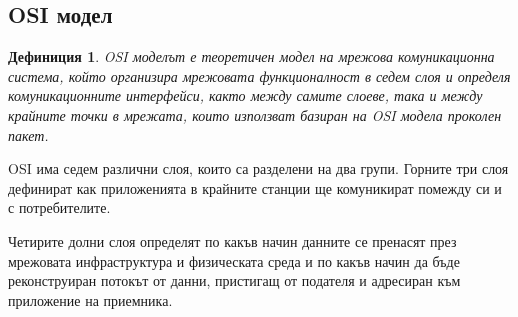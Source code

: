 \documentclass{scrartcl}
\newtheorem{definition}{Дефиниция}
\begin{document}
\subsection{OSI модел}
\begin{definition}
  OSI моделът е \emph{теоретичен} модел на мрежова комуникационна система, който
  организира мрежовата функционалност в седем слоя и определя комуникационните
  интерфейси, както между самите слоеве, така и между крайните точки в мрежата,
  които използват базиран на OSI модела проколен пакет.
\end{definition}

OSI има седем различни слоя, които са разделени на два групи. Горните три слоя
дефинират как приложенията в крайните станции ще комуникират помежду си и с
потребителите.

Четирите долни слоя определят по какъв начин данните се пренасят през мрежовата
инфраструктура и физическата среда и по какъв начин да бъде реконструиран
потокът от данни, пристигащ от подателя и адресиран към приложение на приемника.
\end{document}
